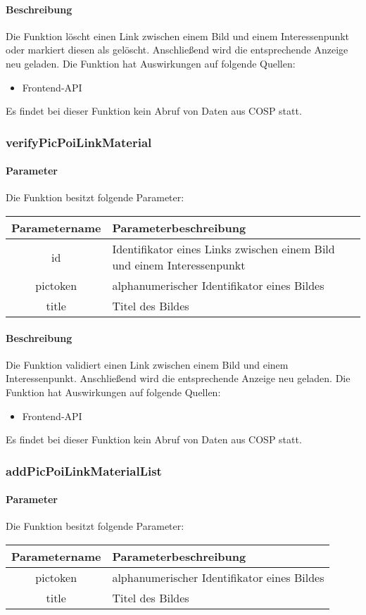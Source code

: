 \paragraph{Beschreibung} Die Funktion löscht einen Link zwischen einem Bild und einem Interessenpunkt oder markiert diesen als gelöscht. Anschließend wird die entsprechende Anzeige neu geladen. Die Funktion hat Auswirkungen auf folgende Quellen:
\begin{itemize}
	\item Frontend-API
\end{itemize}
Es findet bei dieser Funktion kein Abruf von Daten aus {\glqq COSP\grqq} statt.
\subsubsection{verifyPicPoiLinkMaterial}
\paragraph{Parameter} Die Funktion besitzt folgende Parameter:
\begin{table}[H]
	\begin{tabular}{|c|p{11cm}|}
		\hline
		\textbf{Parametername} & \textbf{Parameterbeschreibung} \\ \hline
		id       & Identifikator eines Links zwischen einem Bild und einem Interessenpunkt \\ \hline
		pictoken & alphanumerischer Identifikator eines Bildes \\ \hline
		title    & Titel des Bildes \\ \hline
	\end{tabular}
\end{table}
\paragraph{Beschreibung} Die Funktion validiert einen Link zwischen einem Bild und einem Interessenpunkt. Anschließend wird die entsprechende Anzeige neu geladen. Die Funktion hat Auswirkungen auf folgende Quellen:
\begin{itemize}
	\item Frontend-API
\end{itemize}
Es findet bei dieser Funktion kein Abruf von Daten aus {\glqq COSP\grqq} statt.
\subsubsection{addPicPoiLinkMaterialList}
\paragraph{Parameter} Die Funktion besitzt folgende Parameter:
\begin{table}[H]
	\begin{tabular}{|c|p{11cm}|}
		\hline
		\textbf{Parametername} & \textbf{Parameterbeschreibung} \\ \hline
		pictoken & alphanumerischer Identifikator eines Bildes \\ \hline
		title    & Titel des Bildes \\ \hline
	\end{tabular}
\end{table}
